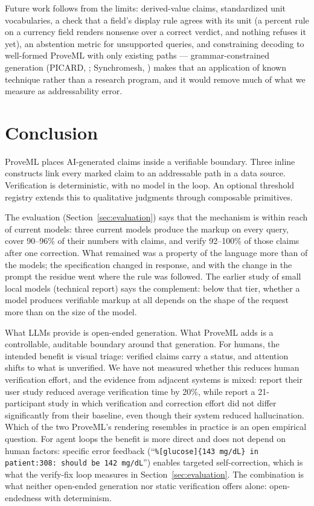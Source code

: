 \documentclass[11pt,a4paper]{article}
\begin{document}
\noindent Future work follows from the limits: derived-value claims, standardized unit vocabularies, a check that a field's display rule agrees with its unit (a percent rule on a currency field renders nonsense over a correct verdict, and nothing refuses it yet), an abstention metric for unsupported queries, and constraining decoding to well-formed ProveML with only existing paths --- grammar-constrained generation (PICARD, \citealp{picard}; Synchromesh, \citealp{synchromesh}) makes that an application of known technique rather than a research program, and it would remove much of what we measure as addressability error.

\section{Conclusion}

ProveML places AI-generated claims inside a verifiable boundary. Three inline constructs link every marked claim to an addressable path in a data source. Verification is deterministic, with no model in the loop. An optional threshold registry extends this to qualitative judgments through composable primitives.

The evaluation (Section~\ref{sec:evaluation}) says that the mechanism is within reach of current models: three current models produce the markup on every query, cover 90--96\% of their numbers with claims, and verify 92--100\% of those claims after one correction. What remained was a property of the language more than of the models; the specification changed in response, and with the change in the prompt the residue went where the rule was followed. The earlier study of small local models (technical report) says the complement: below that tier, whether a model produces verifiable markup at all depends on the shape of the request more than on the size of the model.

What LLMs provide is open-ended generation. What ProveML adds is a controllable, auditable boundary around that generation. For humans, the intended benefit is visual triage: verified claims carry a status, and attention shifts to what is unverified. We have not measured whether this reduces human verification effort, and the evidence from adjacent systems is mixed: \citet{symgen} report their user study reduced average verification time by 20\%, while \citet{ten2026} report a 21-participant study in which verification and correction effort did not differ significantly from their baseline, even though their system reduced hallucination. Which of the two ProveML's rendering resembles in practice is an open empirical question. For agent loops the benefit is more direct and does not depend on human factors: specific error feedback (``\texttt{\%[glucose]\{143 mg/dL\} in patient:308: should be 142 mg/dL}'') enables targeted self-correction, which is what the verify-fix loop measures in Section~\ref{sec:evaluation}. The combination is what neither open-ended generation nor static verification offers alone: open-endedness with determinism.
\end{document}

